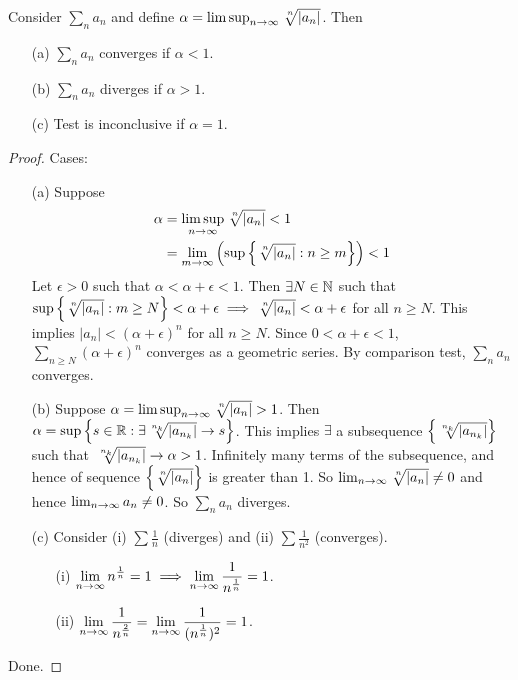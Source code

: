\documentclass[]{article}
\begin{document}
\begin{theorem}
	 Consider $\sum_n a_n$ and define $\alpha = \limsup_{n\ra\infty} \nrt{n}{|a_n|}$.
	Then
	\begin{enumerate}
		\item[(a)] $\sum_n a_n$ converges if $\alpha<1$.
		\item[(b)] $\sum_n a_n$ diverges if $\alpha>1$.
		\item[(c)] Test is inconclusive if $\alpha = 1$.
	\end{enumerate}
\end{theorem}
\newpage
\begin{proof}
	Cases:
	\begin{enumerate}
		\item[(a)] Suppose 
			\begin{align*}
				\alpha &= \limsup_{n\ra\infty} \nrt{n}{|a_n|}<1 \\
					   &= \lim_{m\ra\infty}\left(\sup\setc{\nrt{n}{|a_n|}}{n\geq m} \right) < 1
			\end{align*}
			Let $\epsilon>0$ such that $\alpha < \alpha +\epsilon < 1$.
			Then $\exists N\in\mathbb{N}$ such that $\sup\setc{\nrt{n}{|a_n|}}{m\geq N} < \alpha+\epsilon \implies \nrt{n}{|a_n|}<\alpha+\epsilon$ for all $n\geq N$.
			This implies $|a_n|<(\alpha+\epsilon)^n$ for all $n\geq N$.
			Since $0<\alpha+\epsilon<1$, $\sum_{n\geq N}(\alpha+\epsilon)^n$ converges as a geometric series.
			By comparison test, $\sum_n a_n$ converges.
		\item[(b)] Suppose $\alpha = \limsup_{n\ra\infty} \nrt{n}{|a_n|} >1$.
			Then $\alpha = \sup\setc{s\in\mb R}{\exists \nrt{n_k}{|a_{n_k}|}\ra s}$.
			This implies $\exists$ a subsequence $\set{\nrt{n_k}{|a_{n_k}|}}$ such that $\nrt{n_k}{|a_{n_k}|}\ra \alpha > 1$.
			Infinitely many terms of the subsequence, and hence of sequence $\set{\nrt{n}{|a_n|}}$ is greater than 1.
			So $\lim_{n\ra\infty}\nrt{n}{|a_n|}\neq 0$ and hence $\lim_{n\rightarrow\infty} a_n\neq 0$.
			So $\sum_na_n$ diverges.
		\item[(c)] Consider (i) $\sum\frac1n$ (diverges) and (ii) $\sum\frac1{n^2}$ (converges).
			\begin{enumerate}
				\item[(i)] $\displaystyle\lim_{n\rightarrow\infty}n^\frac{1}{n} = 1\implies \lim_{n\rightarrow\infty} \frac{1}{n^\frac{1}{n}} = 1$.
				\item[(ii)] $\displaystyle\lim_{n\rightarrow\infty}\frac{1}{n^\frac{2}{n}} = \lim_{n\rightarrow\infty} \frac{1}{(n^\frac{1}{n})^2} = 1$.
			\end{enumerate}
	\end{enumerate}
	Done.
\end{proof}
\end{document}
